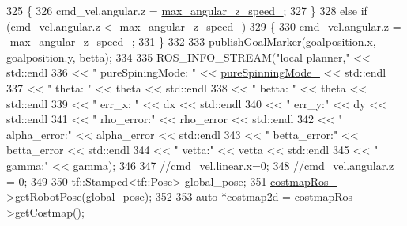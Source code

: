 \begin{DoxyCode}
{325     \{
326         cmd\_vel.angular.z = \hyperlink{classmove__base__z__client_1_1backward__local__planner_1_1BackwardLocalPlanner_a8b5cbc273dfcf1c5e15ac4475b45ca97}{max\_angular\_z\_speed\_};
327     \}
328     \textcolor{keywordflow}{else} \textcolor{keywordflow}{if} (cmd\_vel.angular.z < -\hyperlink{classmove__base__z__client_1_1backward__local__planner_1_1BackwardLocalPlanner_a8b5cbc273dfcf1c5e15ac4475b45ca97}{max\_angular\_z\_speed\_})
329     \{
330         cmd\_vel.angular.z = -\hyperlink{classmove__base__z__client_1_1backward__local__planner_1_1BackwardLocalPlanner_a8b5cbc273dfcf1c5e15ac4475b45ca97}{max\_angular\_z\_speed\_};
331     \}
332 
333     \hyperlink{classmove__base__z__client_1_1backward__local__planner_1_1BackwardLocalPlanner_a691e565d33666d2f7004e791cae29b42}{publishGoalMarker}(goalposition.x, goalposition.y, betta);
334 
335     ROS\_INFO\_STREAM(\textcolor{stringliteral}{"local planner,"} << std::endl
336                                      << \textcolor{stringliteral}{" pureSpiningMode: "} << 
      \hyperlink{classmove__base__z__client_1_1backward__local__planner_1_1BackwardLocalPlanner_abf2b84c0d7a841a7fcec1b93bf5fdd0e}{pureSpinningMode\_} << std::endl
337                                      << \textcolor{stringliteral}{" theta: "} << theta << std::endl
338                                      << \textcolor{stringliteral}{" betta: "} << theta << std::endl
339                                      << \textcolor{stringliteral}{" err\_x: "} << dx << std::endl
340                                      << \textcolor{stringliteral}{" err\_y:"} << dy << std::endl
341                                      << \textcolor{stringliteral}{" rho\_error:"} << rho\_error << std::endl
342                                      << \textcolor{stringliteral}{" alpha\_error:"} << alpha\_error << std::endl
343                                      << \textcolor{stringliteral}{" betta\_error:"} << betta\_error << std::endl
344                                      << \textcolor{stringliteral}{" vetta:"} << vetta << std::endl
345                                      << \textcolor{stringliteral}{" gamma:"} << gamma);
346 
347     \textcolor{comment}{//cmd\_vel.linear.x=0;}
348     \textcolor{comment}{//cmd\_vel.angular.z = 0;}
349 
350     tf::Stamped<tf::Pose> global\_pose;
351     \hyperlink{classmove__base__z__client_1_1backward__local__planner_1_1BackwardLocalPlanner_a865618f84238fe6ff437d1e38ec5fec0}{costmapRos\_}->getRobotPose(global\_pose);
352 
353     \textcolor{keyword}{auto} *costmap2d = \hyperlink{classmove__base__z__client_1_1backward__local__planner_1_1BackwardLocalPlanner_a865618f84238fe6ff437d1e38ec5fec0}{costmapRos\_}->getCostmap();
}
\end{DoxyCode}
